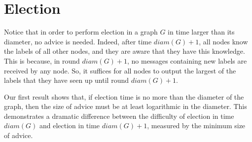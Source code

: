 \documentclass[11pt]{article}
\newcommand{\diam}[1]{\ensuremath{{diam}(#1)}}
\begin{document}
\section{Election}


Notice that in order to perform election in a graph $G$ in time larger than its diameter, no advice is needed. Indeed, after time $\diam{G}+1$, all nodes
know the labels of all other nodes, and  they are aware that they have this knowledge. This is because, in round $\diam{G}+1$, no messages containing new labels are received by any node. So, it suffices for all nodes to output the largest of the labels that they have seen up until round $\diam{G}+1$. 

Our first result shows that, if election time is no more than the diameter of the graph, then the size of advice must be at least logarithmic in the diameter. 
This demonstrates a dramatic difference between the difficulty of election in time $\diam{G}$ and election in time $\diam{G}+1$, measured by the minimum size of advice.
\end{document}
